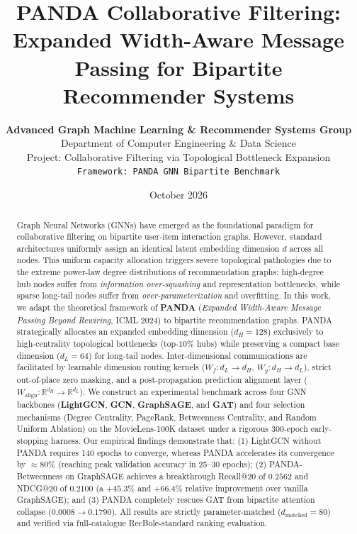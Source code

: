 \documentclass[11pt,a4paper]{article}
\title{\textbf{PANDA Collaborative Filtering: Expanded Width-Aware Message Passing for Bipartite Recommender Systems}}
\author{
    \textbf{Advanced Graph Machine Learning \& Recommender Systems Group} \\
    Department of Computer Engineering \& Data Science \\
    Project: Collaborative Filtering via Topological Bottleneck Expansion \\
    \texttt{\small Framework: PANDA GNN Bipartite Benchmark}
}
\date{October 2026}
\begin{document}
\maketitle

\begin{abstract}
Graph Neural Networks (GNNs) have emerged as the foundational paradigm for collaborative filtering on bipartite user-item interaction graphs. However, standard architectures uniformly assign an identical latent embedding dimension $d$ across all nodes. This uniform capacity allocation triggers severe topological pathologies due to the extreme power-law degree distributions of recommendation graphs: high-degree hub nodes suffer from \textit{information over-squashing} and representation bottlenecks, while sparse long-tail nodes suffer from \textit{over-parameterization} and overfitting. In this work, we adapt the theoretical framework of \textbf{PANDA} (\textit{Expanded Width-Aware Message Passing Beyond Rewiring}, ICML 2024) to bipartite recommendation graphs. PANDA strategically allocates an expanded embedding dimension ($d_H = 128$) exclusively to high-centrality topological bottlenecks (top-$10\%$ hubs) while preserving a compact base dimension ($d_L = 64$) for long-tail nodes. Inter-dimensional communications are facilitated by learnable dimension routing kernels ($W_f: d_L \to d_H$, $W_g: d_H \to d_L$), strict out-of-place zero masking, and a post-propagation prediction alignment layer ($W_{\text{align}}: \mathbb{R}^{d_H} \to \mathbb{R}^{d_L}$). We construct an experimental benchmark across four GNN backbones (\textbf{LightGCN}, \textbf{GCN}, \textbf{GraphSAGE}, and \textbf{GAT}) and four selection mechanisms (Degree Centrality, PageRank, Betweenness Centrality, and Random Uniform Ablation) on the MovieLens-100K dataset under a rigorous 300-epoch early-stopping harness. Our empirical findings demonstrate that: (1) LightGCN without PANDA requires 140 epochs to converge, whereas PANDA accelerates its convergence by $\approx 80\%$ (reaching peak validation accuracy in 25--30 epochs); (2) PANDA-Betweenness on GraphSAGE achieves a breakthrough Recall@20 of $\mathbf{0.2562}$ and NDCG@20 of $\mathbf{0.2100}$ (a $+45.3\%$ and $+66.4\%$ relative improvement over vanilla GraphSAGE); and (3) PANDA completely rescues GAT from bipartite attention collapse ($0.0008 \to 0.1790$). All results are strictly parameter-matched ($d_{\text{matched}} = 80$) and verified via full-catalogue RecBole-standard ranking evaluation.
\end{abstract}
\end{document}
